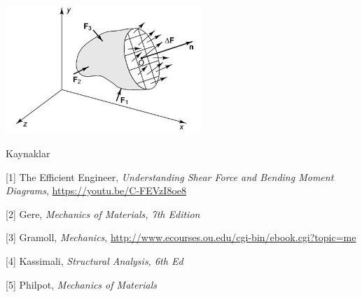 \documentclass[12pt,fleqn]{article}\usepackage{../../common}
\begin{document}
\includegraphics[width=20em]{phy_020_strs_02_17.jpg}

Kaynaklar 

[1] The Efficient Engineer, {\em Understanding Shear Force and Bending Moment Diagrams},
    \url{https://youtu.be/C-FEVzI8oe8}

[2] Gere, {\em Mechanics of Materials, 7th Edition}

[3] Gramoll, {\em Mechanics},
    \url{http://www.ecourses.ou.edu/cgi-bin/ebook.cgi?topic=me}

[4] Kassimali, {\em Structural Analysis, 6th Ed}

[5] Philpot, {\em Mechanics of Materials}
    
\end{document}
